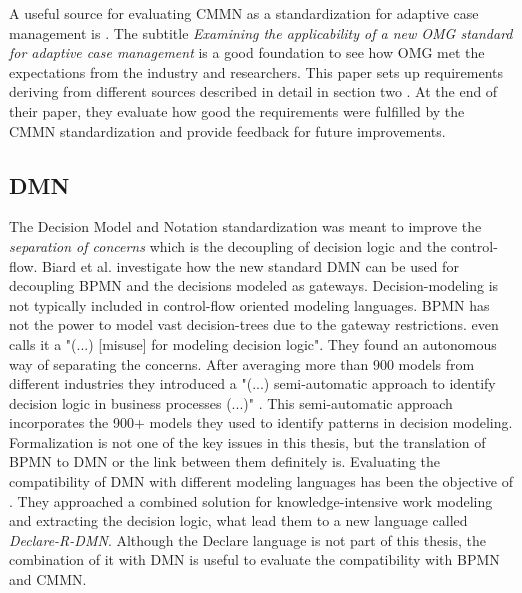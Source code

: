 \documentclass[11pt,a4paper,draft]{article}
\begin{document}
A useful source for evaluating CMMN as a standardization for adaptive case management is \citep{KurzSchmidtFleischmannEtAl2015}. The subtitle \textit{Examining the applicability of a new OMG standard for adaptive case management} is a good foundation to see how OMG met the expectations from the industry and researchers. This paper sets up requirements deriving from different sources described in detail in section two \citep[see][section 2]{KurzSchmidtFleischmannEtAl2015}. At the end of their paper, they evaluate how good the requirements were fulfilled by the CMMN standardization and provide feedback for future improvements. 

\subsection{DMN}
The Decision Model and Notation standardization was meant to improve the \textit{separation of concerns} \citep{BiardMauffBigandEtAl2015} which is the decoupling of decision logic and the control-flow. Biard et al. investigate how the new standard DMN can be used for decoupling BPMN and the decisions modeled as gateways. Decision-modeling is not typically included in control-flow oriented modeling languages. BPMN has not the power to model vast decision-trees due to the gateway restrictions. \citep{BatoulisMeyerBazhenovaEtAl2015} even calls it a "(...) [misuse] for modeling decision logic". They found an autonomous way of separating the concerns. After averaging more than 900 models from different industries they introduced a "(...) semi-automatic approach to identify decision logic in business processes (...)" \citep{BatoulisMeyerBazhenovaEtAl2015}. This semi-automatic approach incorporates the 900+ models they used to identify patterns in decision modeling. Formalization is not one of the key issues in this thesis, but the translation of BPMN to DMN or the link between them definitely is. 
Evaluating the compatibility of DMN with different modeling languages has been the objective of \citeauthor*{MertensGaillyPoels2015}. They approached a combined solution for knowledge-intensive work modeling and extracting the decision logic, what lead them to a new language called \textit{Declare-R-DMN}. Although the Declare language is not part of this thesis, the combination of it with DMN is useful to evaluate the compatibility with BPMN and CMMN. 
\end{document}
